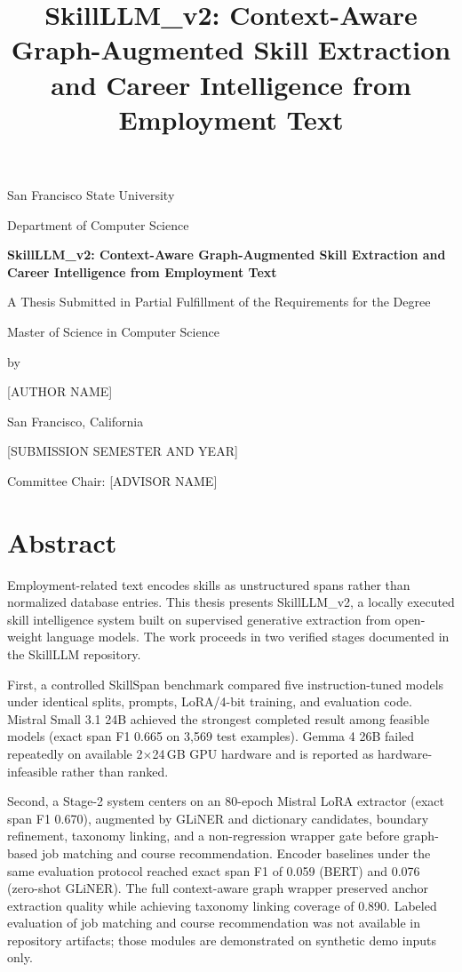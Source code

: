 \documentclass[12pt,oneside]{report}
\title{SkillLLM\_v2: Context-Aware Graph-Augmented Skill Extraction\\and Career Intelligence from Employment Text}
\author{\thesisauthor}
\date{\thesissubmissiondate}
\newcommand{\thesisauthor}{[AUTHOR NAME]}
\newcommand{\thesisadvisor}{[ADVISOR NAME]}
\newcommand{\thesisdegree}{Master of Science in Computer Science}
\newcommand{\thesisuniversity}{San Francisco State University}
\newcommand{\thesissubmissiondate}{[SUBMISSION SEMESTER AND YEAR]}
\begin{document}
\onehalfspacing

\begin{titlepage}
  \centering
  {\large \thesisuniversity\par}
  {\large Department of Computer Science\par}
  \vspace{2cm}
  {\LARGE\bfseries SkillLLM\_v2: Context-Aware Graph-Augmented Skill Extraction and Career Intelligence from Employment Text\par}
  \vspace{2cm}
  {\large A Thesis Submitted in Partial Fulfillment of the Requirements for the Degree\par}
  {\large \thesisdegree\par}
  \vspace{2cm}
  {\large by\par}
  {\large \thesisauthor\par}
  \vspace{1.5cm}
  {\large San Francisco, California\par}
  {\large \thesissubmissiondate\par}
  \vfill
  {\large Committee Chair: \thesisadvisor\par}
\end{titlepage}

\chapter*{Abstract}

Employment-related text encodes skills as unstructured spans rather than normalized database entries.
This thesis presents SkillLLM\_v2, a locally executed skill intelligence system built on supervised generative extraction from open-weight language models.
The work proceeds in two verified stages documented in the SkillLLM repository.

First, a controlled SkillSpan benchmark compared five instruction-tuned models under identical splits, prompts, LoRA/4-bit training, and evaluation code.
Mistral Small 3.1 24B achieved the strongest completed result among feasible models (exact span F1 0.665 on 3{,}569 test examples).
Gemma 4 26B failed repeatedly on available 2$\times$24\,GB GPU hardware and is reported as hardware-infeasible rather than ranked.

Second, a Stage-2 system centers on an 80-epoch Mistral LoRA extractor (exact span F1 0.670), augmented by GLiNER and dictionary candidates, boundary refinement, taxonomy linking, and a non-regression wrapper gate before graph-based job matching and course recommendation.
Encoder baselines under the same evaluation protocol reached exact span F1 of 0.059 (BERT) and 0.076 (zero-shot GLiNER).
The full context-aware graph wrapper preserved anchor extraction quality while achieving taxonomy linking coverage of 0.890.
Labeled evaluation of job matching and course recommendation was not available in repository artifacts; those modules are demonstrated on synthetic demo inputs only.
\end{document}
